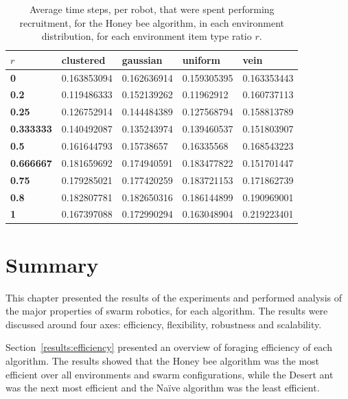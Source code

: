 \begin{table}[]
\centering
\caption{Average time steps, per robot, that were spent performing recruitment, for the Honey bee algorithm, in each environment distribution, for each environment item type ratio $r$.}
\label{averagetimerecruitment}
\begin{tabular}{@{}lllll@{}}
\toprule
$r$            & \textbf{clustered} & \textbf{gaussian} & \textbf{uniform} & \textbf{vein} \\ \midrule
\textbf{0}        & 0.163853094        & 0.162636914       & 0.159305395      & 0.163353443   \\
\textbf{0.2}      & 0.119486333        & 0.152139262       & 0.11962912       & 0.160737113   \\
\textbf{0.25}     & 0.126752914        & 0.144484389       & 0.127568794      & 0.158813789   \\
\textbf{0.333333} & 0.140492087        & 0.135243974       & 0.139460537      & 0.151803907   \\
\textbf{0.5}      & 0.161644793        & 0.15738657        & 0.16335568       & 0.168543223   \\
\textbf{0.666667} & 0.181659692        & 0.174940591       & 0.183477822      & 0.151701447   \\
\textbf{0.75}     & 0.179285021        & 0.177420259       & 0.183721153      & 0.171862739   \\
\textbf{0.8}      & 0.182807781        & 0.182650316       & 0.186144899      & 0.190969001   \\
\textbf{1}        & 0.167397088        & 0.172990294       & 0.163048904      & 0.219223401   \\ \bottomrule
\end{tabular}
\end{table}

\section{Summary}
\label{results:summary}

This chapter presented the results of the experiments and performed analysis of the major properties of swarm robotics, for each algorithm. The results were discussed around four axes: efficiency, flexibility, robustness and scalability. 

Section~\ref{results:efficiency} presented an overview of foraging efficiency of each algorithm. The results showed that the Honey bee algorithm was the most efficient over all environments and swarm configurations, while the Desert ant was the next most efficient and the Na\"ive algorithm was the least efficient.

